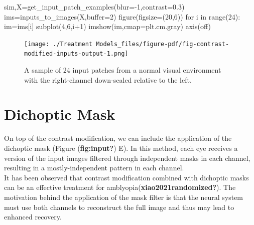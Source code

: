 \documentclass[
  letterpaper,
  DIV=11,
  numbers=noendperiod]{scrreprt}
\newenvironment{Shaded}{\begin{snugshade}}{\end{snugshade}}
\newcommand{\BuiltInTok}[1]{\textcolor[rgb]{0.00,0.23,0.31}{#1}}
\newcommand{\ControlFlowTok}[1]{\textcolor[rgb]{0.00,0.23,0.31}{#1}}
\newcommand{\DecValTok}[1]{\textcolor[rgb]{0.68,0.00,0.00}{#1}}
\newcommand{\FloatTok}[1]{\textcolor[rgb]{0.68,0.00,0.00}{#1}}
\newcommand{\KeywordTok}[1]{\textcolor[rgb]{0.00,0.23,0.31}{#1}}
\newcommand{\NormalTok}[1]{\textcolor[rgb]{0.00,0.23,0.31}{#1}}
\newcommand{\OperatorTok}[1]{\textcolor[rgb]{0.37,0.37,0.37}{#1}}
\newcommand{\StringTok}[1]{\textcolor[rgb]{0.13,0.47,0.30}{#1}}
\begin{document}
\begin{Shaded}
\begin{Highlighting}[]
\NormalTok{sim,X}\OperatorTok{=}\NormalTok{get\_input\_patch\_examples(blur}\OperatorTok{={-}}\DecValTok{1}\NormalTok{,contrast}\OperatorTok{=}\FloatTok{0.3}\NormalTok{)}
\NormalTok{ims}\OperatorTok{=}\NormalTok{inputs\_to\_images(X,}\BuiltInTok{buffer}\OperatorTok{=}\DecValTok{2}\NormalTok{)}
\NormalTok{figure(figsize}\OperatorTok{=}\NormalTok{(}\DecValTok{20}\NormalTok{,}\DecValTok{6}\NormalTok{))}
\ControlFlowTok{for}\NormalTok{ i }\KeywordTok{in} \BuiltInTok{range}\NormalTok{(}\DecValTok{24}\NormalTok{):}
\NormalTok{    im}\OperatorTok{=}\NormalTok{ims[i]}
\NormalTok{    subplot(}\DecValTok{4}\NormalTok{,}\DecValTok{6}\NormalTok{,i}\OperatorTok{+}\DecValTok{1}\NormalTok{)}
\NormalTok{    imshow(im,cmap}\OperatorTok{=}\NormalTok{plt.cm.gray)}
\NormalTok{    axis(}\StringTok{\textquotesingle{}off\textquotesingle{}}\NormalTok{)}
    
\end{Highlighting}
\end{Shaded}

\begin{figure}[H]

{\centering \texttt{[image: ./Treatment Models\_files/figure-pdf/fig-contrast-modified-inputs-output-1.png]}

}

\caption{\label{fig-contrast-modified-inputs}A sample of 24 input
patches from a normal visual environment with the right-channel
down-scaled relative to the left.}

\end{figure}

\hypertarget{dichoptic-mask}{%
\section{Dichoptic Mask}\label{dichoptic-mask}}

On top of the contrast modification, we can include the application of
the dichoptic mask (Figure (\textbf{fig:input?}) E). In this method,
each eye receives a version of the input images filtered through
independent masks in each channel, resulting in a mostly-independent
pattern in each channel.\\
It has been observed that contrast modification combined with dichoptic
masks can be an effective treatment for
amblyopia(\textbf{xiao2021randomized?}). The motivation behind the
application of the mask filter is that the neural system must use both
channels to reconstruct the full image and thus may lead to enhanced
recovery.
\end{document}
